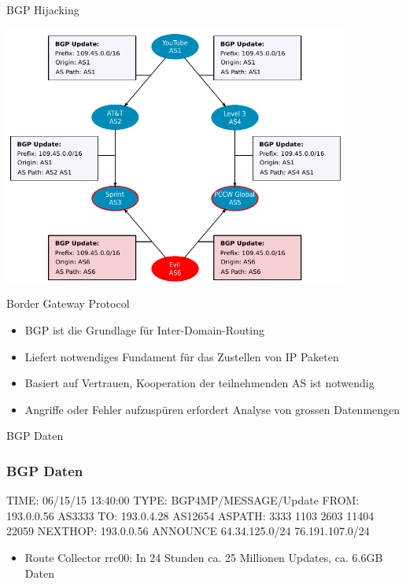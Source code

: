 \documentclass[9pt]{beamer}
\begin{document}
\begin{frame}{BGP Hijacking}{}
	\begin{center}
		\includegraphics[width=0.85\textwidth]{res/prefix_hijack.pdf}
	\end{center}
\end{frame}
\begin{frame}{Border Gateway Protocol}
    \begin{itemize}
        \pause
        \item{BGP ist die Grundlage für Inter-Domain-Routing}
        \pause
        \item{Liefert notwendiges Fundament für das Zustellen von IP Paketen}
        \pause
        \item{Basiert auf Vertrauen, Kooperation der teilnehmenden AS ist notwendig}
        \pause
        \item{Angriffe oder Fehler aufzuspüren erfordert Analyse von grossen Datenmengen}
    \end{itemize}
\end{frame}
\begin{frame}{BGP Daten}{}
	\begin{center}
	\end{center}
\end{frame}
\begin{frame}[fragile]\frametitle{BGP Daten}
    \begin{semiverbatim}
        TIME: 06/15/15 13:40:00
        TYPE: BGP4MP/MESSAGE/Update
        FROM: 193.0.0.56 AS3333
        TO: 193.0.4.28 AS12654
        ASPATH: 3333 1103 2603 11404 22059
        NEXT\textunderscore HOP: 193.0.0.56
        ANNOUNCE
          64.34.125.0/24
            76.191.107.0/24
        \end{semiverbatim}
        \pause
        \begin{itemize}
            \item{Route Collector rrc00: In 24 Stunden ca. 25 Millionen Updates, ca. 6.6GB Daten}

        \end{itemize}
\end{frame}
\end{document}
